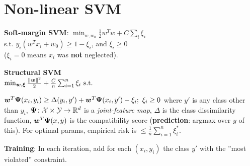 \section{Non-linear SVM}
\textbf{Soft-margin SVM}:
$\min_{w, w_0} \frac{1}{2} w^T w + C \sum_i \xi_i$\\
s.t. $y_i(w^Tx_i+w_0) \geq 1-\xi_i$, and $\xi_i\geq0$\\
($\xi_i=0$ means $x_i$ was \textbf{not} neglected).

\textbf{Structural SVM}\\
$
\min_{\boldsymbol{w}, \boldsymbol{\xi}} \frac{\left\lVert\boldsymbol{w}\right\rVert^2}{2}
+ \frac{C}{n} \sum_{i=1}^n \xi_i
 \text{ s.t. } $
 
$
\boldsymbol{w}^T \boldsymbol{\Psi}(x_i, y_i) \geq \Delta(y_i, y') + \boldsymbol{w}^T \boldsymbol{\Psi}(x_i, y') -\xi_i;
\ \xi_i \geq 0
$
%
where $y'$ is any class other than $y_i$,
$\boldsymbol{\Psi} \colon \mathcal{X} \times \mathcal{Y} \rightarrow \mathbb R^d$ is a \textit{joint-feature map},
$\Delta$ is the class dissimilarity function,
$\boldsymbol{w}^T\boldsymbol{\Psi}(x, y)$ is the compatibility score (\textbf{prediction}: argmax over $y$ of this).
For optimal params, empirical risk is $\leq \frac{1}{n} \sum_{i=1}^n \xi^*_i$.

\textbf{Training}: In each iteration, add for each $(x_i, y_i)$ the class $y'$ with the ''most violated'' constraint.